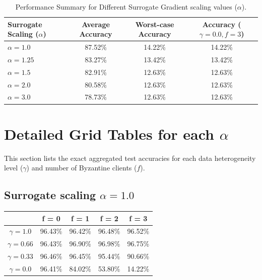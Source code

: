 \documentclass{article}
\begin{document}
\begin{table}[htbp]
    \centering
    \caption{Performance Summary for Different Surrogate Gradient scaling values ($\alpha$).}
    \label{tab:summary}
    \begin{tabular}{lccc}
        \toprule
        \textbf{Surrogate Scaling ($\alpha$)} & \textbf{Average Accuracy} & \textbf{Worst-case Accuracy} & \textbf{Accuracy ($\gamma=0.0, f=3$)} \\
        \midrule
        $\alpha = 1.0$ & 87.52\% & 14.22\% & 14.22\% \\
        $\alpha = 1.25$ & 83.27\% & 13.42\% & 13.42\% \\
        $\alpha = 1.5$ & 82.91\% & 12.63\% & 12.63\% \\
        $\alpha = 2.0$ & 80.58\% & 12.63\% & 12.63\% \\
        $\alpha = 3.0$ & 78.73\% & 12.63\% & 12.63\% \\
        \bottomrule
    \end{tabular}
\end{table}

\section{Detailed Grid Tables for each $\alpha$}
This section lists the exact aggregated test accuracies for each data heterogeneity level ($\gamma$) and number of Byzantine clients ($f$).

\subsection{Surrogate scaling $\alpha = 1.0$}
\begin{table}[htbp]
    \centering
    \begin{tabular}{ccccc}
        \toprule
        & \textbf{f = 0} & \textbf{f = 1} & \textbf{f = 2} & \textbf{f = 3} \\
        \midrule
        $\gamma = 1.0$ & 96.43\% & 96.42\% & 96.48\% & 96.52\% \\
        $\gamma = 0.66$ & 96.43\% & 96.90\% & 96.98\% & 96.75\% \\
        $\gamma = 0.33$ & 96.46\% & 96.45\% & 95.44\% & 90.66\% \\
        $\gamma = 0.0$ & 96.41\% & 84.02\% & 53.80\% & 14.22\% \\
        \bottomrule
    \end{tabular}
\end{table}
\end{document}

